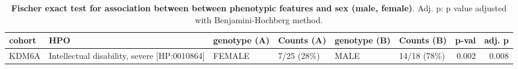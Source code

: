\begin{table}
\centering
\begin{scriptsize}
\begin{tabular}{l>{\raggedright}p{3cm}lp{2cm}lp{2.4cm}rr}
\toprule
\textbf{cohort} & \textbf{HPO} & \textbf{genotype (A)} & \textbf{Counts (A)} & \textbf{genotype (B)} & \textbf{Counts (B)} & \textbf{p-val} & \textbf{adj. p}\\
\midrule
KDM6A & Intellectual disability, severe [HP:0010864] & FEMALE & 7/25 (28\%) & MALE & 14/18 (78\%) & 0.002 & 0.008\\
\bottomrule
\end{tabular}
\end{scriptsize}
\caption{\textbf{Fischer exact test for association between  between phenotypic features and sex (male, female)}. Adj. p: p value adjusted with Benjamini-Hochberg method.}
\label{tab:mf_hpo}
\end{table}
\clearpage
\newpage


